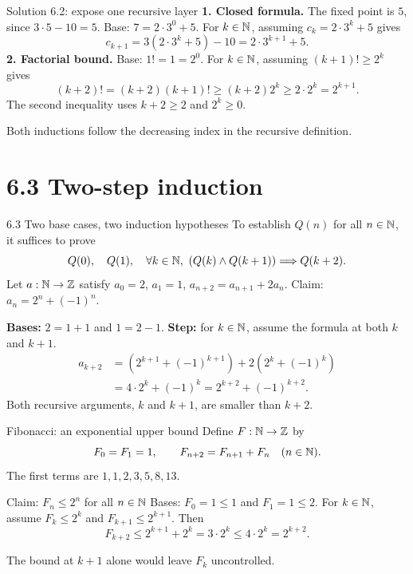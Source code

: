 \begin{frame}{Solution 6.2: expose one recursive layer}
\textbf{1. Closed formula.} The fixed point is $5$, since $3\cdot5-10=5$.
Base: $7=2\cdot3^0+5$.
For $k\in\mathbb{N}$, assuming $c_k=2\cdot3^k+5$ gives
\[
 c_{k+1}=3(2\cdot3^k+5)-10=2\cdot3^{k+1}+5.
\]
\textbf{2. Factorial bound.} Base: $1!=1=2^0$.
For $k\in\mathbb{N}$, assuming $(k+1)!\ge2^k$ gives
\[
 (k+2)!=(k+2)(k+1)!\ge(k+2)2^k\ge2\cdot2^k=2^{k+1}.
\]
The second inequality uses $k+2\ge2$ and $2^k\ge0$.

Both inductions follow the decreasing index in the recursive definition.
\end{frame}

\section{6.3 Two-step induction}
\begin{frame}{6.3 Two base cases, two induction hypotheses}
To establish $Q(n)$ for all $n\in\mathbb{N}$, it suffices to prove
\[
 Q(0),\quad Q(1),\quad
 \forall k\in\mathbb{N},\ (Q(k)\land Q(k+1))\Longrightarrow Q(k+2).
\]
Let $a:\mathbb{N}\to\mathbb{Z}$ satisfy $a_0=2$, $a_1=1$,
$a_{n+2}=a_{n+1}+2a_n$. Claim: $a_n=2^n+(-1)^n$.

\textbf{Bases:} $2=1+1$ and $1=2-1$.
\textbf{Step:} for $k\in\mathbb{N}$, assume the formula at both $k$ and $k+1$.
\[
\begin{aligned}
 a_{k+2}&=(2^{k+1}+(-1)^{k+1})+2(2^k+(-1)^k)\\
 &=4\cdot2^k+(-1)^k=2^{k+2}+(-1)^{k+2}.
\end{aligned}
\]
Both recursive arguments, $k$ and $k+1$, are smaller than $k+2$.
\end{frame}

\begin{frame}{Fibonacci: an exponential upper bound}
Define $F:\mathbb{N}\to\mathbb{Z}$ by
\[
 F_0=F_1=1,\qquad F_{n+2}=F_{n+1}+F_n\quad(n\in\mathbb{N}).
\]
The first terms are $1,1,2,3,5,8,13$.
\begin{block}{Claim: $F_n\le2^n$ for all $n\in\mathbb{N}$}
Bases: $F_0=1\le1$ and $F_1=1\le2$.
For $k\in\mathbb{N}$, assume $F_k\le2^k$ and $F_{k+1}\le2^{k+1}$.
Then
\[
 F_{k+2}\le2^{k+1}+2^k=3\cdot2^k
 \le4\cdot2^k=2^{k+2}.
\]
\end{block}
The bound at $k+1$ alone would leave $F_k$ uncontrolled.
\end{frame}

